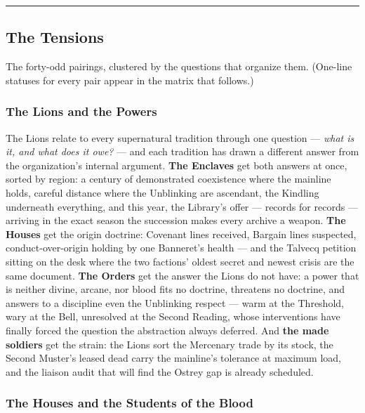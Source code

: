 \medskip\hrule\medskip

\subsection{The Tensions}

The forty-odd pairings, clustered by the questions that organize them. (One-line statuses for every pair appear in the matrix that follows.)

\subsubsection{The Lions and the Powers}

The Lions relate to every supernatural tradition through one question --- \textit{what is it, and what does it owe?} --- and each tradition has drawn a different answer from the organization's internal argument. \textbf{The Enclaves} get both answers at once, sorted by region: a century of demonstrated coexistence where the mainline holds, careful distance where the Unblinking are ascendant, the Kindling underneath everything, and this year, the Library's offer --- records for records --- arriving in the exact season the succession makes every archive a weapon. \textbf{The Houses} get the origin doctrine: Covenant lines received, Bargain lines suspected, conduct-over-origin holding by one Banneret's health --- and the Talvecq petition sitting on the desk where the two factions' oldest secret and newest crisis are the same document. \textbf{The Orders} get the answer the Lions do not have: a power that is neither divine, arcane, nor blood fits no doctrine, threatens no doctrine, and answers to a discipline even the Unblinking respect --- warm at the Threshold, wary at the Bell, unresolved at the Second Reading, whose interventions have finally forced the question the abstraction always deferred. And \textbf{the made soldiers} get the strain: the Lions sort the Mercenary trade by its stock, the Second Muster's leased dead carry the mainline's tolerance at maximum load, and the liaison audit that will find the Ostrey gap is already scheduled.

\subsubsection{The Houses and the Students of the Blood}

